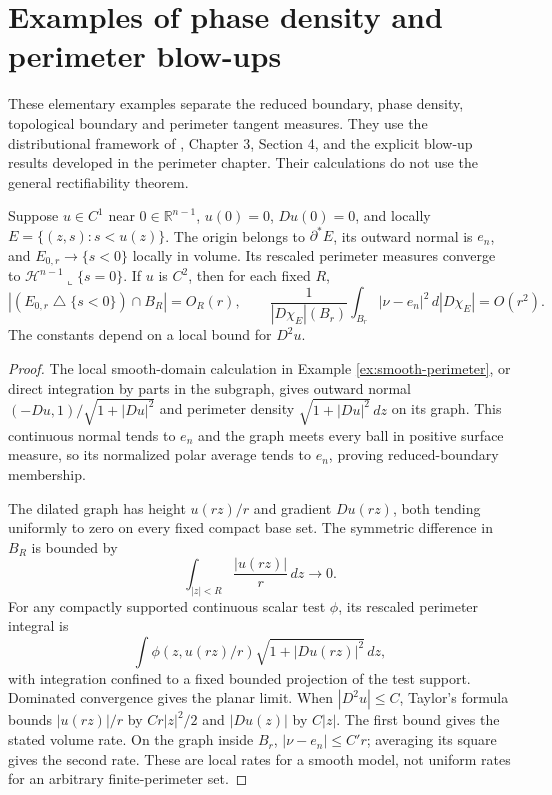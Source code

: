 \chapter{Examples of phase density and perimeter blow-ups}\label{sec:examples-perimeter-blowups}
These elementary examples separate the reduced boundary, phase density, topological boundary and perimeter tangent measures. They use the distributional framework of \cite{Sim18}, Chapter 3, Section 4, and the explicit blow-up results developed in the perimeter chapter. Their calculations do not use the general rectifiability theorem.

\begin{example}\label{ex:smooth-subgraph-blowup}
Suppose $u\in C^1$ near $0\in\mathbb R^{n-1}$, $u(0)=0$, $Du(0)=0$, and locally $E=\{(z,s):s<u(z)\}$. The origin belongs to $\partial^*E$, its outward normal is $e_n$, and $E_{0,r}\to\{s<0\}$ locally in volume. Its rescaled perimeter measures converge to $\mathcal H^{n-1}\llcorner\{s=0\}$.
If $u$ is $C^2$, then for each fixed $R$,
\[
 |(E_{0,r}\mathbin{\triangle}\{s<0\})\cap B_R|=O_R(r),
 \qquad
 \frac{1}{|D\chi_E|(B_r)}\int_{B_r}|\nu-e_n|^2\,d|D\chi_E|=O(r^2).
\]
The constants depend on a local bound for $D^2u$.
\end{example}
\begin{proof}
The local smooth-domain calculation in Example \ref{ex:smooth-perimeter}, or direct integration by parts in the subgraph, gives outward normal $(-Du,1)/\sqrt{1+|Du|^2}$ and perimeter density $\sqrt{1+|Du|^2}\,dz$ on its graph. This continuous normal tends to $e_n$ and the graph meets every ball in positive surface measure, so its normalized polar average tends to $e_n$, proving reduced-boundary membership.

The dilated graph has height $u(rz)/r$ and gradient $Du(rz)$, both tending uniformly to zero on every fixed compact base set. The symmetric difference in $B_R$ is bounded by
\[
 \int_{|z|<R}\frac{|u(rz)|}{r}\,dz\longrightarrow0.
\]
For any compactly supported continuous scalar test $\phi$, its rescaled perimeter integral is
\[
 \int\phi(z,u(rz)/r)\sqrt{1+|Du(rz)|^2}\,dz,
\]
with integration confined to a fixed bounded projection of the test support. Dominated convergence gives the planar limit. When $|D^2u|\leq C$, Taylor's formula bounds $|u(rz)|/r$ by $Cr|z|^2/2$ and $|Du(z)|$ by $C|z|$. The first bound gives the stated volume rate. On the graph inside $B_r$, $|\nu-e_n|\leq C' r$; averaging its square gives the second rate. These are local rates for a smooth model, not uniform rates for an arbitrary finite-perimeter set.
\end{proof}

